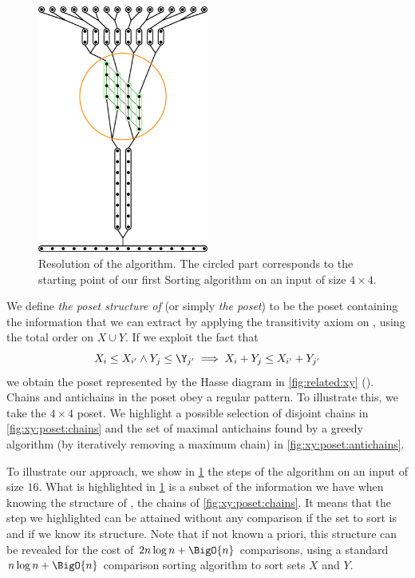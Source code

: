 \begin{figure}
\centering
\includegraphics[width=0.5\textwidth,angle=90]{fig/x+y/poset/mergexy}
\caption{Resolution of the \mergesort algorithm. The circled part
corresponds to the starting point of our first Sorting \XY algorithm on an
input of size \(4 \times 4\).}
\label{fig:xy:poset:mergexy}
\end{figure}

We define \emph{the poset structure of \XY} (or simply \emph{the \XY poset}) to be the poset
containing the information that we can extract by applying the
transitivity axiom on \XY, using the total order on \(X \cup Y\). If we exploit the fact that
\begin{displaymath}
X_i \le X_{i'} \land Y_j \le \Y_{j'} \implies X_i + Y_j \le X_{i'} + Y_{j'}
\end{displaymath}
we obtain the poset represented by the Hasse diagram
in \ref{fig:related:xy} ().
Chains and antichains
in the \XY poset obey a regular pattern. To illustrate this, we take the $4 \times 4$
\XY poset. We highlight a possible selection of disjoint chains in
\ref{fig:xy:poset:chains} and the set of maximal antichains found by a greedy
algorithm (by iteratively removing a maximum chain) in \ref{fig:xy:poset:antichains}.

To illustrate our approach, we show in \ref{fig:xy:poset:mergexy} the steps of
the \mergesort algorithm on an input of size \(16\).
What is highlighted in \ref{fig:xy:poset:mergexy} is a subset of the
information we have when knowing the structure of \XY, \ie the chains of
\ref{fig:xy:poset:chains}. It means that the step we
highlighted can be attained without any comparison if the set to sort is \XY
and if we know its structure. Note that if not known a priori, this structure
can be revealed for the cost of \(2n \log n + \BigO{n}\) comparisons, using a standard \(n
\log n + \BigO{n}\) comparison sorting algorithm to sort sets \(X\) and \(Y\).

